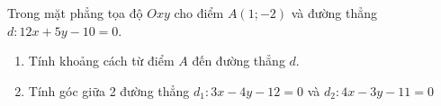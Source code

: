 \begin{bt}%
    Trong mặt phẳng tọa độ $Oxy$ cho điểm $A(1 ;-2)$ và đường thẳng $d\colon 12 x+5 y-10=0$.
\begin{enumerate}
    \item Tính khoảng cách từ điểm $A$ đến đường thẳng $d$.
    \item Tính góc giữa 2 đường thẳng $d_1\colon 3 x-4 y-12=0$ và $d_2\colon 4 x-3 y-11=0$
\end{enumerate}
\end{bt}


